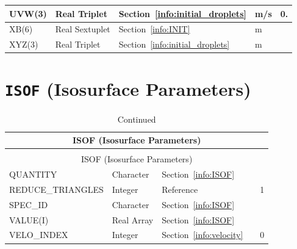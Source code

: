 \documentclass[11pt]{book}
\begin{document}
\begin{longtable}{@{\extracolsep{\fill}}|l|l|l|l|l|}
{\ct UVW(3)}                    & Real Triplet      & Section~\ref{info:initial_droplets}           & m/s           & 0.            \\ \hline
{\ct XB(6)}                     & Real Sextuplet    & Section~\ref{info:INIT}                       & m             &               \\ \hline
{\ct XYZ(3)}                    & Real Triplet      & Section~\ref{info:initial_droplets}           & m             &               \\ \hline
\end{longtable}


\vspace{\baselineskip}



\section{\texorpdfstring{{\tt ISOF}}{ISOF} (Isosurface Parameters)}


\begin{longtable}{@{\extracolsep{\fill}}|l|l|l|l|l|}
\caption[Isosurface parameters ({\ct ISOF} namelist group)]{For more information see Section~\ref{info:ISOF}.}
\label{tbl:ISOF} \\
\hline
\multicolumn{5}{|c|}{{\ct ISOF} (Isosurface Parameters)} \\
\hline \hline
\endfirsthead
\caption[]{Continued} \\
\hline
\multicolumn{5}{|c|}{{\ct ISOF} (Isosurface Parameters)} \\
\hline \hline
\endhead
{\ct QUANTITY}              & Character     & Section~\ref{info:ISOF}                   &       &         \\ \hline
{\ct REDUCE\_TRIANGLES}     & Integer       & Reference~\cite{Smokeview_Users_Guide}    &       & 1       \\ \hline
{\ct SPEC\_ID}              & Character     & Section~\ref{info:ISOF}                   &       &         \\ \hline
{\ct VALUE(I)}              & Real Array    & Section~\ref{info:ISOF}                   &       &         \\ \hline
{\ct VELO\_INDEX}           & Integer       & Section~\ref{info:velocity}               &       &  0      \\ \hline
\end{longtable}


\vspace{\baselineskip}
\end{document}
